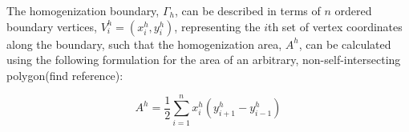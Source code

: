 

The homogenization boundary, $\Gamma_{h}$, can be described in terms of $n$ ordered boundary vertices, $V_{i}^{h}=(x_{i}^{h},y_{i}^{h})$, representing the $i$th set of vertex coordinates along the boundary, such that the homogenization area, $A^{h}$, can be calculated using the following formulation for the area of an arbitrary, non-self-intersecting polygon(find reference): 

\begin{equation}
A^{h}=\dfrac{1}{2}\sum_{i=1}^{n}x_{i}^{h}(y_{i+1}^{h}-y_{i-1}^{h})
\label{eqn:hom1}
\end{equation}




